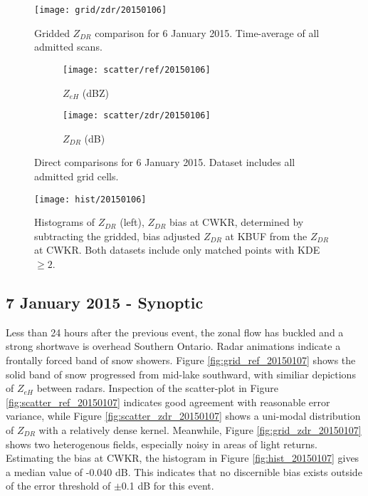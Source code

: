 \begin{figure}[H]
\texttt{[image: grid/zdr/20150106]}
\caption{Gridded $Z_{DR}$ comparison for 6 January 2015. Time-average of all admitted scans.} 
\label{fig:grid_zdr_20150106}
\end{figure}

\begin{figure}[H]
\centering
   \begin{subfigure}{0.49\linewidth} \centering
     \texttt{[image: scatter/ref/20150106]}
     \caption{$Z_{eH}$ (dBZ)}\label{fig:scatter_ref_20150106}
   \end{subfigure}
   \begin{subfigure}{0.49\linewidth} \centering
     \texttt{[image: scatter/zdr/20150106]}
     \caption{$Z_{DR}$ (dB)}\label{fig:scatter_zdr_20150106}
   \end{subfigure}
\caption{Direct comparisons for 6 January 2015. Dataset includes all admitted grid cells.} \label{fig:scatter_20150106}
\end{figure}

\begin{figure}[H]
\texttt{[image: hist/20150106]}\centering
\caption{Histograms of $Z_{DR}$ (left), $Z_{DR}$ bias at CWKR, determined by subtracting the gridded, bias adjusted $Z_{DR}$ at KBUF from the $Z_{DR}$ at
CWKR. Both datasets include only matched points with KDE $\geq 2$. } 
\label{fig:hist_20150106}
\end{figure}

\subsection{7 January 2015 - Synoptic}
Less than 24 hours after the previous event, the zonal flow has buckled and a strong shortwave is overhead Southern Ontario. Radar animations indicate a
frontally forced band of snow showers. Figure \ref{fig:grid_ref_20150107} shows the solid band of snow progressed from mid-lake southward, with similiar
depictions of $Z_{eH}$ between radars. Inspection of the scatter-plot in Figure \ref{fig:scatter_ref_20150107} indicates good agreement with reasonable error
variance, while Figure \ref{fig:scatter_zdr_20150107} shows a uni-modal distribution of $Z_{DR}$ with a relatively dense kernel.
Meanwhile, Figure \ref{fig:grid_zdr_20150107} shows two heterogenous fields, especially noisy in areas of light returns. 
Estimating the bias at CWKR, the histogram in Figure \ref{fig:hist_20150107} gives a median value of -0.040 dB. This indicates that no discernible bias
exists outside of the error threshold of $\pm$0.1 dB for this event.

